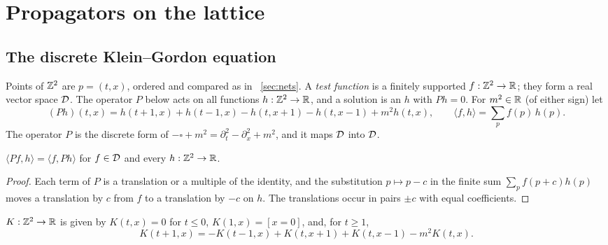 \clearpage
\section{Propagators on the lattice}\label{sec:lattice}

\noindent{}

\subsection{The discrete Klein--Gordon equation}

\noindent Points of $\mathbb Z^2$ are $p=(t,x)$, ordered and compared as in
~\ref{sec:nets}. A \emph{test function} is a finitely supported $f:\mathbb Z^2\to\mathbb R$; they form
a real vector space $\mathcal D$. The operator $P$ below acts on all functions $h:\mathbb Z^2\to\mathbb R$, and a solution is an $h$ with
$Ph=0$. For $m^2\in\mathbb R$ (of either sign)
let
\[
(Ph)(t,x)=h(t+1,x)+h(t-1,x)-h(t,x+1)-h(t,x-1)+m^2h(t,x),\qquad
\langle f,h\rangle=\sum_pf(p)\,h(p).
\]
The operator $P$ is the discrete form of $-\square+m^2=\partial_t^2-\partial_x^2+m^2$, and it
maps $\mathcal D$ into $\mathcal D$.

\begin{lemma}[Symmetry of $P$]\label{lem:kg-symmetric}
 $\langle Pf,h\rangle=\langle f,Ph\rangle$ for
 $f\in\mathcal D$ and every $h:\mathbb Z^2\to\mathbb R$.
\end{lemma}
\begin{proof}
Each term of $P$ is a translation or a multiple of the identity, and the substitution
$p\mapsto p-c$ in the finite sum $\sum_pf(p+c)h(p)$ moves a translation by $c$ from $f$ to a
translation by $-c$ on $h$. The translations occur in pairs $\pm c$ with equal coefficients.
\end{proof}

\begin{definition}\label{def:kernel}
$K:\mathbb Z^2\to\mathbb R$ is given by $K(t,x)=0$ for $t\leq0$, $K(1,x)=[x=0]$, and, for $t\geq1$,
\[
K(t+1,x)=-K(t-1,x)+K(t,x+1)+K(t,x-1)-m^2K(t,x).
\]
\end{definition}

